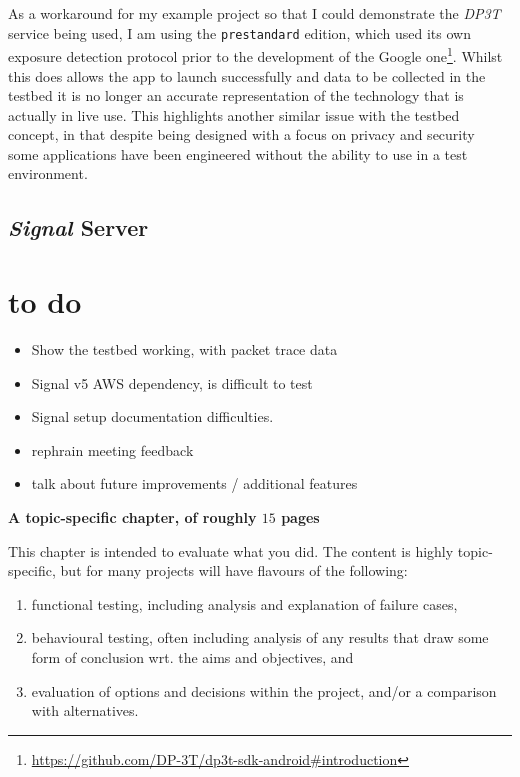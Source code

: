 \documentclass[
    author={Jacob Daniel Halsey},
    supervisor={Prof. Awais Rashid},
    degree={BSc},
    title={Building a Testbed for Evaluating Privacy Enhancing Technologies  (PETs)},
    subtitle={},
    type={software development},
    year={2021}
]{dissertation}
\begin{document}
As a workaround for my example project so that I could demonstrate the \emph{DP3T} service being used,
I am using the \texttt{prestandard} edition, which used its own exposure detection protocol prior to the development
of the Google one\footnote{\url{https://github.com/DP-3T/dp3t-sdk-android\#introduction}}. 
Whilst this does allows the app to launch successfully and data to be collected in the testbed
it is no longer an accurate representation of the technology that is actually in live use. This highlights another
similar issue with the testbed concept, in that despite being designed with a focus on privacy and security~\cite{gaen}
some applications have been engineered without the ability to use in a test environment.




\subsection{\emph{Signal} Server}


\section{to do}

\begin{itemize}
	\item Show the testbed working, with packet trace data
	\item Signal v5 AWS dependency,  is difficult to test
	\item Signal setup documentation difficulties.
	\item rephrain meeting feedback
	\item talk about future improvements / additional features
\end{itemize}

\vspace{2cm} 
{\bf A topic-specific chapter, of roughly $15$ pages} 
\vspace{1cm} 

\noindent
This chapter is intended to evaluate what you did.  The content is highly 
topic-specific, but for many projects will have flavours of the following:

\begin{enumerate}
\item functional  testing, including analysis and explanation of failure 
      cases,
\item behavioural testing, often including analysis of any results that 
      draw some form of conclusion wrt. the aims and objectives,
      and
\item evaluation of options and decisions within the project, and/or a
      comparison with alternatives.
\end{enumerate}
\end{document}
